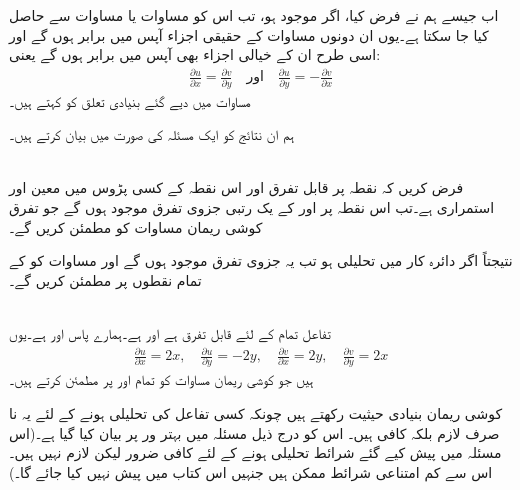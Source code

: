 اب جیسے ہم نے فرض کیا، اگر  موجود ہو، تب اس کو  مساوات  یا مساوات 
 سے حاصل کیا جا سکتا ہے۔یوں ان دونوں مساوات کے حقیقی اجزاء  آپس میں برابر ہوں گے اور اسی طرح ان کے خیالی اجزاء بھی آپس میں برابر ہوں گے یعنی:
\begin{align} \label{مساوات_مخلوط_کوشی_ریمان}
\frac{\partial u}{\partial x}=\frac{\partial v}{\partial y}\quad \text{اور}\quad \frac{\partial u}{\partial y}=-\frac{\partial v}{\partial x}
\end{align}
مساوات  میں دیے گئے بنیادی  تعلق کو  کہتے ہیں۔

ہم ان نتائج کو ایک مسئلہ کی صورت میں بیان کرتے ہیں۔

\quad {}\\
فرض کریں کہ  نقطہ  پر قابل تفرق اور اس نقطہ کے کسی پڑوس میں معین اور استمراری ہے۔تب اس نقطہ پر  اور  کے یک رتبی جزوی تفرق موجود ہوں گے  جو تفرق کوشی ریمان مساوات  کو مطمئن کریں گے۔ 

نتیجتاً اگر دائرہ کار  میں  تحلیلی ہو تب یہ جزوی تفرق موجود ہوں گے اور مساوات  کو  کے تمام نقطوں پر مطمئن کریں گے۔

\quad {}\\
تفاعل  تمام  کے لئے قابل تفرق ہے اور  ہے۔ہمارے پاس  اور  ہے۔یوں
\begin{align*}
\frac{\partial u}{\partial x}=2x,\quad \frac{\partial u}{\partial y}=-2y,\quad \frac{\partial v}{\partial x}=2y,\quad \frac{\partial v}{\partial y}=2x
\end{align*}
ہیں جو کوشی ریمان مساوات  کو تمام  اور  پر مطمئن کرتے ہیں۔

کوشی ریمان بنیادی حیثیت رکھتے ہیں چونکہ کسی تفاعل کی تحلیلی ہونے کے لئے  یہ نا صرف لازم بلکہ کافی ہیں۔ اس کو درج ذیل مسئلہ میں بہتر ور پر بیان کیا گیا ہے۔(اس مسئلہ میں پیش کیے گئے شرائط تحلیلی ہونے کے لئے کافی ضرور لیکن لازم نہیں ہیں۔اس سے کم امتناعی شرائط ممکن ہیں جنہیں اس کتاب میں پیش نہیں کیا جائے گا۔)

